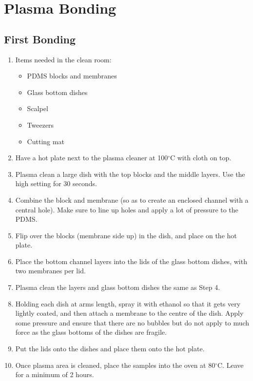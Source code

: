 \section{Plasma Bonding}

\subsection*{First Bonding}

\begin{enumerate}
			 \setlength\itemsep{-0.1em}
	\item Items needed in the clean room: \begin{itemize}
			 \setlength\itemsep{-0.1em}
		\item PDMS blocks and membranes
		\item Glass bottom dishes
		\item Scalpel
		\item Tweezers
		\item Cutting mat
	\end{itemize}
	\item Have a hot plate next to the plasma cleaner at 100$^{\circ}$C with cloth on top.
	\item Plasma clean a large dish with the top blocks and the middle layers. Use the high setting for 30 seconds.
	\item Combine the block and membrane (so as to create an enclosed channel with a central hole). Make sure to line up holes and apply a lot of pressure to the PDMS.
	\item Flip over the blocks (membrane side up) in the dish, and place on the hot plate.
	\item Place the bottom channel layers into the lids of the glass bottom dishes, with two membranes per lid.
	\item Plasma clean the layers and glass bottom dishes the same as Step 4.
	\item Holding each dish at arms length, spray it with ethanol so that it gets very lightly coated, and then attach a membrane to the centre of the dish. Apply some pressure and ensure that there are no bubbles but do not apply to much force as the glass bottoms of the dishes are fragile. 
	\item Put the lids onto the dishes and place them onto the hot plate.
	\item Once plasma area is cleaned, place the samples into the oven at 80$^{\circ}$C. Leave for a minimum of 2 hours.
\end{enumerate}

